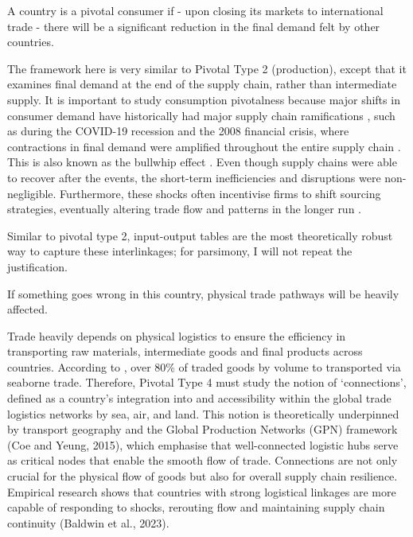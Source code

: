 \documentclass[11pt]{article}
\def\highlight#1#2{
	\begin{centering}
    
		\vspace{1.2ex}
		\begin{minipage}{0.8\linewidth}
			\begin{tcolorbox}[
				boxsep=3.3pt,
				boxrule=0.4pt,
				colback=white,
				colbacktitle=white,
				coltitle=black,
				colframe=black,
				title=\centering \textbf{#1},
			]
				\centering
				#2
			\end{tcolorbox}
		\end{minipage}
		\vspace{1.2ex}
        
	\end{centering}
}
\begin{document}
\highlight{Pivotal Type 3: Consumption}{A country is a pivotal consumer if - upon closing its markets to international trade - there will be a significant reduction in the final demand felt by other countries.}

The framework here is very similar to Pivotal Type 2 (production), except that it examines final demand at the end of the supply chain, rather than intermediate supply. It is important to study consumption pivotalness because major shifts in consumer demand have historically had major supply chain ramifications \citep{fernandez2019}, such as during the COVID-19 recession and the 2008 financial crisis, where contractions in final demand were amplified throughout the entire supply chain \citep{baldwin2009}. This is also known as the bullwhip effect \citep{lee1997}. Even though supply chains were able to recover after the events, the short-term inefficiencies and disruptions were non-negligible. Furthermore, these shocks often incentivise firms to shift sourcing strategies, eventually altering trade flow and patterns in the longer run \citep{ferrari2025}.
 
Similar to pivotal type 2, input-output tables are the most theoretically robust way to capture these interlinkages; for parsimony, I will not repeat the justification.


\highlight{Pivotal Type 4: Geographic}{If something goes wrong in this country, physical trade pathways will be heavily affected.}

Trade heavily depends on physical logistics to ensure the efficiency in transporting raw materials, intermediate goods and final products across countries. According to \citet{unctad2023}, over 80\% of traded goods by volume to transported via seaborne trade. Therefore, Pivotal Type 4 must study the notion of ‘connections’, defined as a country’s integration into and accessibility within the global trade logistics networks by sea, air, and land. This notion is theoretically underpinned by transport geography \citep{rodrigue2012,hesse2020} and the Global Production Networks (GPN) framework (Coe and Yeung, 2015), which emphasise that well-connected logistic hubs serve as critical nodes that enable the smooth flow of trade. Connections are not only crucial for the physical flow of goods but also for overall supply chain resilience. Empirical research shows that countries with strong logistical linkages are more capable of responding to shocks, rerouting flow and maintaining supply chain continuity (Baldwin et al., 2023). 
\end{document}
